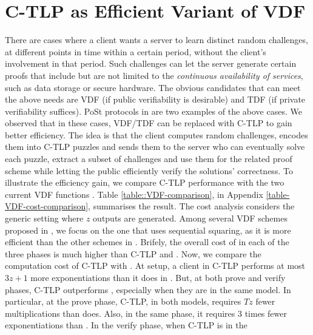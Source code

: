 
\section{C-TLP as Efficient Variant of VDF}\label{section::Variant-of-VDF}

\vspace{-2mm}

There are cases where a client wants a server to learn distinct random challenges, at different points in time within a certain period, without the client's involvement in that period. Such challenges can let the server generate certain proofs that include but are not limited to the \emph{continuous availability of services}, such as data storage or secure hardware. The obvious candidates that can meet the above needs are VDF (if  public verifiability is desirable) and TDF (if   private verifiability suffices). PoSt protocols  in \cite{Storage-Time} are two examples of the above cases. We observed that in these cases, VDF/TDF can be replaced with  C-TLP to gain better efficiency. The idea is that the client computes random challenges, encodes them into C-TLP puzzles and sends them to the server who can eventually solve each puzzle, extract a subset of challenges and use them for the related proof scheme while letting the public efficiently verify the solutions' correctness. To illustrate the efficiency gain,  we compare C-TLP performance with the two current VDF functions \cite{Wesolowski19,BonehBBF18}. Table \ref{table::VDF-comparison},  in Appendix \ref{table-VDF-cost-comparison}, summarises the result. The cost analysis considers the generic setting where $z$ outputs are generated. Among several VDF schemes proposed in \cite{BonehBBF18}, we focus on the one that uses sequential squaring, as it is more efficient than the other schemes in \cite{BonehBBF18}.   Brifely, the overall cost of \cite{BonehBBF18} in each of the three phases is much higher than C-TLP and \cite{Wesolowski19}. Now, we compare the computation cost of C-TLP  with  \cite{Wesolowski19}.  At setup, a client  in C-TLP  performs at most $3z+1$ more exponentiations than it does in \cite{Wesolowski19}. But, at both prove and verify phases, C-TLP   outperforms \cite{BonehBBF18}, especially when they are in the same model. In particular,  at the prove phase, C-TLP, in both models,  requires $Tz$ fewer multiplications than  \cite{Wesolowski19} does. Also, in the same phase, it requires $3$ times fewer exponentiations than \cite{Wesolowski19}. In the verify phase,  when C-TLP is in the
